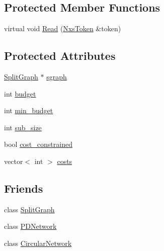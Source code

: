 \subsection*{Protected Member Functions}
\begin{DoxyCompactItemize}
\item 
virtual void \hyperlink{classMPdaBlock_a80e0ffd8121c77ad6ee49810cd58b1bf}{Read} (\hyperlink{classNxsToken}{NxsToken} \&token)
\end{DoxyCompactItemize}
\subsection*{Protected Attributes}
\begin{DoxyCompactItemize}
\item 
\hyperlink{classSplitGraph}{SplitGraph} $\ast$ \hyperlink{classMPdaBlock_a277cd105fdf1b93184da7deb04279cbb}{sgraph}
\item 
int \hyperlink{classMPdaBlock_a694b0dff038fbd8758c08bfef30adfe5}{budget}
\item 
int \hyperlink{classMPdaBlock_a00091599a4c464c6b530b888bbefc7fd}{min\_\-budget}
\item 
int \hyperlink{classMPdaBlock_a3a6d616fef6b8dfc9f16e098545c5675}{sub\_\-size}
\item 
bool \hyperlink{classMPdaBlock_ab7786c1edc907720b5f309365d6ea070}{cost\_\-constrained}
\item 
vector$<$ int $>$ \hyperlink{classMPdaBlock_a541fd9f72745ea8c285cf1ea8aeb6074}{costs}
\end{DoxyCompactItemize}
\subsection*{Friends}
\begin{DoxyCompactItemize}
\item 
\hypertarget{classMPdaBlock_ab8ea3e9164803ba3b6b59fab949bd0f3}{
class \hyperlink{classMPdaBlock_ab8ea3e9164803ba3b6b59fab949bd0f3}{SplitGraph}}
\label{classMPdaBlock_ab8ea3e9164803ba3b6b59fab949bd0f3}

\item 
\hypertarget{classMPdaBlock_aa341ce7452c8af86ea325aa7eff2f02d}{
class \hyperlink{classMPdaBlock_aa341ce7452c8af86ea325aa7eff2f02d}{PDNetwork}}
\label{classMPdaBlock_aa341ce7452c8af86ea325aa7eff2f02d}

\item 
\hypertarget{classMPdaBlock_a1615e6a0c22088bac5824899e6c3fa6e}{
class \hyperlink{classMPdaBlock_a1615e6a0c22088bac5824899e6c3fa6e}{CircularNetwork}}
\label{classMPdaBlock_a1615e6a0c22088bac5824899e6c3fa6e}

\end{DoxyCompactItemize}


